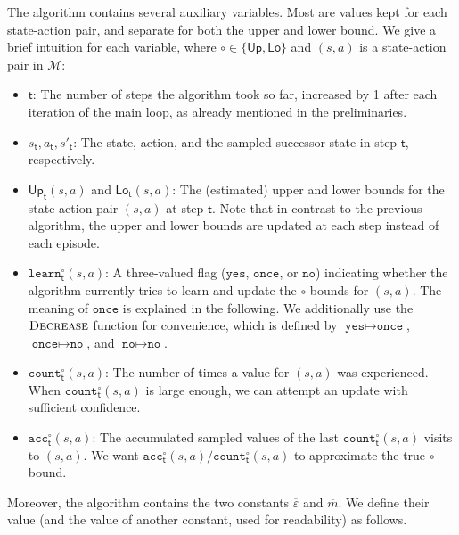 \documentclass{article}
\newcommand{\MDP}{\mathcal{M}}
\newcommand{\upperbound}{\mathsf{Up}}
\newcommand{\lowerbound}{\mathsf{Lo}}
\newcommand{\updatestep}{{\overline{\varepsilon}}}
\newcommand{\delay}{{\overline{m}}}
\newcommand{\acc}{\texttt{acc}}
\newcommand{\visitcount}{\texttt{count}}
\newcommand{\learn}{\texttt{learn}}
\newcommand{\learnyes}{\texttt{yes}}
\newcommand{\learnonce}{\texttt{once}}
\newcommand{\learnno}{\texttt{no}}
\newcommand{\learndecrease}{\textsc{Decrease}}
\newcommand{\algostep}{\mathsf{t}}
\begin{document}
The algorithm contains several auxiliary variables.
Most are values kept for each state-action pair, and separate for both the upper and lower bound.
We give a brief intuition for each variable, where $\circ \in \{\upperbound, \lowerbound\}$ and $(s, a)$ is a state-action pair in $\MDP$:
\begin{itemize}
	\item
	$\algostep$: The number of steps the algorithm took so far, increased by 1 after each iteration of the main loop, as already mentioned in the preliminaries.

	\item
	$s_\algostep, a_\algostep, s'_\algostep$:
	The state, action, and the sampled successor state in step $\algostep$, respectively.
	\item
	$\upperbound_\algostep(s, a)$ and $\lowerbound_\algostep(s, a)$:
	The (estimated) upper and lower bounds for the state-action pair $(s, a)$ at step $\algostep$.
	Note that in contrast to the previous algorithm, the upper and lower bounds are updated at each step instead of each episode.
	\item
	$\learn^\circ_\algostep(s, a)$:
	A three-valued flag ($\learnyes$, $\learnonce$, or $\learnno$) indicating whether the algorithm currently tries to learn and update the $\circ$-bounds for $(s, a)$.
	The meaning of $\learnonce$ is explained in the following.
	We additionally use the $\learndecrease$ function for convenience, which is defined by $\learnyes \mapsto \learnonce$, $\learnonce \mapsto \learnno$, and $\learnno \mapsto \learnno$.
	\item
	$\visitcount^\circ_\algostep(s, a)$:
	The number of times a value for $(s, a)$ was experienced.
	When $\visitcount^\circ_\algostep(s, a)$ is large enough, we can attempt an update with sufficient confidence.
	\item
	$\acc^\circ_\algostep(s, a)$:
	The accumulated sampled values of the last $\visitcount_\algostep^\circ(s, a)$ visits to $(s, a)$.
	We want $\acc^\circ_\algostep(s, a) / \visitcount_\algostep^\circ(s, a)$ to approximate the true $\circ$-bound.
\end{itemize}
Moreover, the algorithm contains the two constants $\updatestep$ and $\delay$.
We define their value (and the value of another constant, used for readability) as follows.
\end{document}
